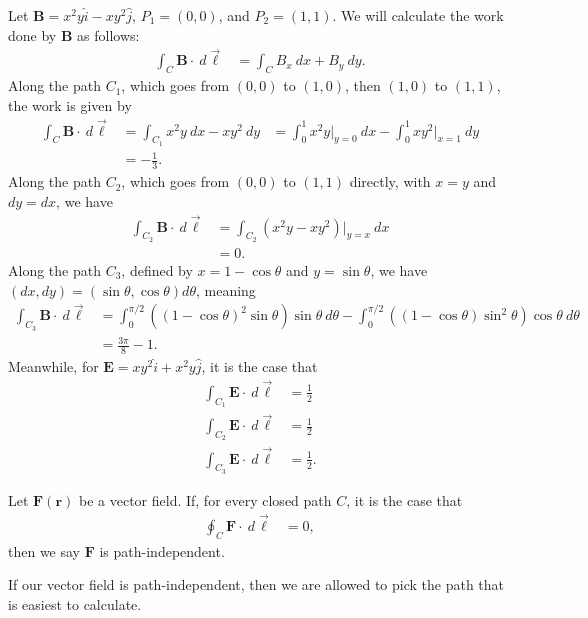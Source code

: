 \documentclass[10pt]{mypackage}
\begin{document}
\begin{example}
  Let $\mathbf{B} = x^2y\hat{i} - xy^2\hat{j}$, $P_1 = (0,0)$, and $P_2 = (1,1)$. We will calculate the work done by $\mathbf{B}$ as follows:
  \begin{align*}
    \int_{C}^{} \mathbf{B}\cdot\:d\vec{\ell} &= \int_{C}^{} B_x\:dx + B_y\:dy.
  \end{align*}
  Along the path $C_1$, which goes from $(0,0)$ to $(1,0)$, then $(1,0)$ to $(1,1)$, the work is given by
  \begin{align*}
    \int_{C}^{} \mathbf{B}\cdot\:d\vec{\ell} &= \int_{C_1}^{} x^2y\:dx-xy^2\:dy
                                             &= \int_{0}^{1} x^2y\bigr\vert_{y=0}\:dx - \int_{0}^{1} xy^2\bigr\vert_{x=1}\:dy\\
                                             &= -\frac{1}{3}.
  \end{align*}
  Along the path $C_2$, which goes from $(0,0)$ to $(1,1)$ directly, with $x = y$ and $dy = dx$, we have
  \begin{align*}
    \int_{C_2}^{} \mathbf{B}\cdot\:d\vec{\ell} &= \int_{C_2}^{} \left(x^2y-xy^2\right)\bigr\vert_{y=x}\:dx\\
                                               &= 0.
  \end{align*}
  Along the path $C_3$, defined by $x = 1-\cos\theta$ and $y = \sin\theta$, we have $\left(dx,dy\right) = \left(\sin\theta,\cos\theta\right)d\theta$, meaning
  \begin{align*}
    \int_{C_3}^{} \mathbf{B}\cdot\:d\vec{\ell} &= \int_{0}^{\pi/2} \left(\left(1-\cos\theta\right)^2\sin\theta\right)\sin\theta\:d\theta - \int_{0}^{\pi/2} \left(\left(1-\cos\theta\right)\sin^2\theta\right)\cos\theta\:d\theta\\
                                               &= \frac{3\pi}{8}-1.
  \end{align*}
  Meanwhile, for $\mathbf{E} = xy^2\hat{i} + x^2y\hat{j}$, it is the case that
  \begin{align*}
    \int_{C_1}^{} \mathbf{E}\cdot\:d\vec{\ell} &= \frac{1}{2}\\
    \int_{C_2}^{} \mathbf{E}\cdot\:d\vec{\ell} &= \frac{1}{2}\\
    \int_{C_3}^{} \mathbf{E}\cdot\:d\vec{\ell} &= \frac{1}{2}.
  \end{align*}
\end{example}
\begin{definition}
  Let $\mathbf{F}\left(\mathbf{r}\right)$ be a vector field. If, for every closed path $C$, it is the case that
  \begin{align*}
    \oint_{C}^{} \mathbf{F}\cdot\:d\vec{\ell} &= 0,
  \end{align*}
  then we say $\mathbf{F}$ is path-independent.
\end{definition}
If our vector field is path-independent, then we are allowed to pick the path that is easiest to calculate.\newline
\end{document}
